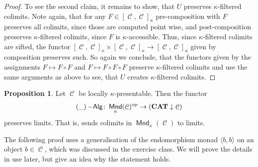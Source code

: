 \documentclass[a4paper,11pt,oneside,openany]{scrbook}
\newcommand{\catname}[1]{{\normalfont\textbf{#1}}}
\DeclareMathOperator{\Alg}{-\mathsf{Alg}}
\newcommand{\CAT}{\catname{CAT}}
\newcommand{\from}{\colon}
\DeclareMathOperator{\op}{\text{op}}
\DeclareMathOperator{\C}{\mathcal{C}}
\DeclareMathOperator{\Mnd}{\mathsf{Mnd}}
\theoremstyle{definition}
\theoremstyle{definition}
\newtheorem{prop}[thm]{Proposition}
\begin{document}
\begin{proof}
   To see the second claim, it remains to show, that $U$ preserves 
   $\kappa$-filtered colimits. Note again, that for any $F \in [\C,\C]_{\kappa}$ pre-composition with $F$ preserves all colimits, since those are computed point wise,
   and post-composition preserves $\kappa$-filtered colimits, since $F$ is $\kappa$-accessible.  Thus, since $\kappa$-filtered colimits are sifted, the functor 
   $[\C,\C]_{\kappa} \times [\C,\C]_{\kappa} \to [\C,\C]_{\kappa}$ given by composition preserves such. So again we conclude, that the functors given by the 
   assignments $F \mapsto F \circ F$ and $F \mapsto F \circ F \circ F$ preserve $\kappa$-filtered colimits and use the same arguments as above to see, that
   $U$ creates $\kappa$-filtered colimits. 
\end{proof}

\begin{prop}
   Let $\C$ be locally $\kappa$-presentable. Then the functor
      \begin{equation*}
            (\_)\Alg \from \Mnd_{\kappa}(\C)^{\op} \to (\CAT \downarrow \C)
      \end{equation*}
   preserves limits. That is, sends colimits in $\Mnd_{\kappa}(\C)$ to limits. 
\end{prop}

The following proof uses a generalisation of the endomorphism monad $\langle b,b\rangle$ on an object $b \in \C$, which was discussed in the exercise class. 
We will prove the details in use later, but give an idea why the statement holds. 
\end{document}
